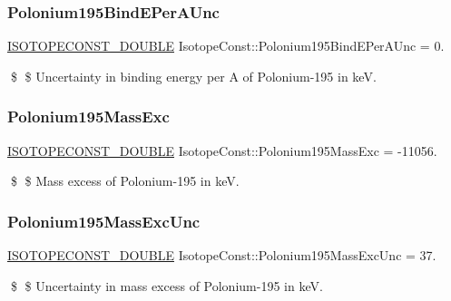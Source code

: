 \subsubsection{\texorpdfstring{Polonium195\+Bind\+E\+Per\+A\+Unc}{Polonium195BindEPerAUnc}}
{\footnotesize\ttfamily \mbox{\hyperlink{group___isotope_const-_macros_ga8f45a7272ce02c0b4c65c44636ed719a}{I\+S\+O\+T\+O\+P\+E\+C\+O\+N\+S\+T\+\_\+\+D\+O\+U\+B\+LE}} Isotope\+Const\+::\+Polonium195\+Bind\+E\+Per\+A\+Unc = 0.}

\$ \$ Uncertainty in binding energy per A of Polonium-\/195 in keV. \mbox{\label{group___isotope_const-_polonium-_po195_ga5d5246941959948d65efbc6618e35443}} 
\subsubsection{\texorpdfstring{Polonium195\+Mass\+Exc}{Polonium195MassExc}}
{\footnotesize\ttfamily \mbox{\hyperlink{group___isotope_const-_macros_ga8f45a7272ce02c0b4c65c44636ed719a}{I\+S\+O\+T\+O\+P\+E\+C\+O\+N\+S\+T\+\_\+\+D\+O\+U\+B\+LE}} Isotope\+Const\+::\+Polonium195\+Mass\+Exc = -\/11056.}

\$ \$ Mass excess of Polonium-\/195 in keV. \mbox{\label{group___isotope_const-_polonium-_po195_ga912af2ad122043613400409d711b0128}} 
\subsubsection{\texorpdfstring{Polonium195\+Mass\+Exc\+Unc}{Polonium195MassExcUnc}}
{\footnotesize\ttfamily \mbox{\hyperlink{group___isotope_const-_macros_ga8f45a7272ce02c0b4c65c44636ed719a}{I\+S\+O\+T\+O\+P\+E\+C\+O\+N\+S\+T\+\_\+\+D\+O\+U\+B\+LE}} Isotope\+Const\+::\+Polonium195\+Mass\+Exc\+Unc = 37.}

\$ \$ Uncertainty in mass excess of Polonium-\/195 in keV. \mbox{\label{group___isotope_const-_polonium-_po195_gab2114bfb09dc3983927bd20e2af1a9da}} 
